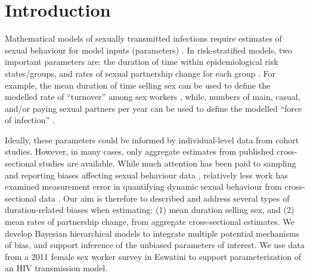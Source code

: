 \section{Introduction}
Mathematical models of sexually transmitted infections require
estimates of sexual behaviour for model inputs (parameters) \cite{Garnett2002}.
In risk-stratified models, two important parameters are:
the duration of time within epidemiological risk states/groups, and
rates of sexual partnership change for each group
\cite{Garnett2002,Watts2010,Boily2015,Knight2020}.
For example, the mean duration of time selling sex can be used to define
the modelled rate of ``turnover'' among sex workers \cite{Knight2020},
while, numbers of main, casual, and/or paying sexual partners per year
can be used to define the modelled ``force of infection'' \cite{Boily2015}.
\par
Ideally, these parameters could be informed by
individual-level data from cohort studies.
However, in many cases, only
aggregate estimates from published cross-sectional studies are available.
While much attention has been paid to
sampling and reporting biases affecting sexual behaviour data \cite{Fenton2001,Langhaug2010},
relatively less work has examined measurement error
in quantifying dynamic sexual behaviour from cross-sectional data \cite{Burington2010,Fazito2012}.
Our aim is therefore to described and address
several types of duration-related biases when estimating:
(1) mean duration selling sex, and (2) mean rates of partnership change,
from aggregate cross-sectional estimates.
We develop Bayesian hierarchical models to
integrate multiple potential mechanisms of bias, and
support inference of the unbiased parameters of interest.
We use data from a 2011 female sex worker survey in Eswatini \cite{Yam2013}
to support parameterization of an HIV transmission model.
